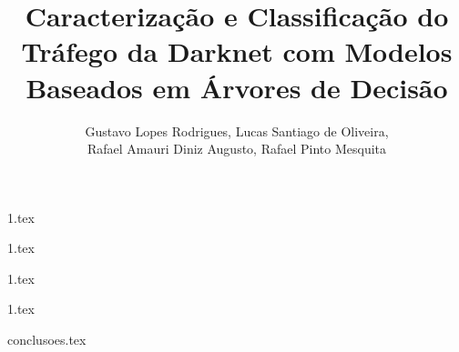 \documentclass[12pt]{article}
\title{Caracterização e Classificação do Tráfego da Darknet com
Modelos Baseados em Árvores de Decisão}
\author{Gustavo Lopes Rodrigues\inst{1}, Lucas Santiago de Oliveira\inst{1}, \\
 Rafael Amauri Diniz Augusto\inst{1}, Rafael Pinto Mesquita\inst{1}}
\begin{document}
 

  \maketitle


  {1.tex}


  {1.tex}


  {1.tex}


  {1.tex}


  {conclusoes.tex}


  
\end{document}
